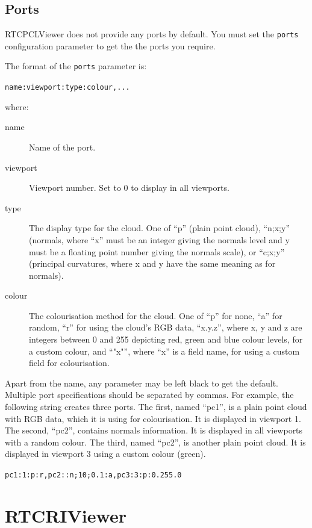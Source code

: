 \documentclass[a4paper,10pt]{article}
\begin{document}
\subsection{Ports}
\label{sec1:viewer_port}

RTCPCLViewer does not provide any ports by default. You must set the \verb|ports| configuration parameter to get the the ports you require.

The format of the \verb|ports| parameter is:

\verb+name:viewport:type:colour,...+

where:

\begin{description}
  \item[name] Name of the port.
  \item[viewport] Viewport number. Set to 0 to display in all viewports.
  \item[type] The display type for the cloud. One of ``p'' (plain point cloud),
  ``n;x;y'' (normals, where ``x'' must be an integer giving the normals level
  and y must be a floating point number giving the normals scale), or ``c;x;y''
  (principal curvatures, where x and y have the same meaning as for normals).
  \item[colour] The colourisation method for the cloud. One of ``p'' for none,
  ``a'' for random, ``r'' for using the cloud's RGB data, ``x.y.z'', where x, y
  and z are integers between 0 and 255 depicting red, green and blue colour
  levels, for a custom colour, and ``"x"'', where ``x'' is a field name, for
  using a custom field for colourisation.
\end{description}

Apart from the name, any parameter may be left black to get the default.
Multiple port specifications should be separated by commas. For example, the
following string creates three ports. The first, named ``pc1'', is a plain
point cloud with RGB data, which it is using for colourisation. It is displayed
in viewport 1. The second, ``pc2'', contains normals information. It is
displayed in all viewports with a random colour. The third, named ``pc2'', is
another plain point cloud. It is displayed in viewport 3 using a custom colour
(green).

\verb|pc1:1:p:r,pc2::n;10;0.1:a,pc3:3:p:0.255.0|

\section{RTCRIViewer}
\label{sec:rtcriviewer}
\end{document}
